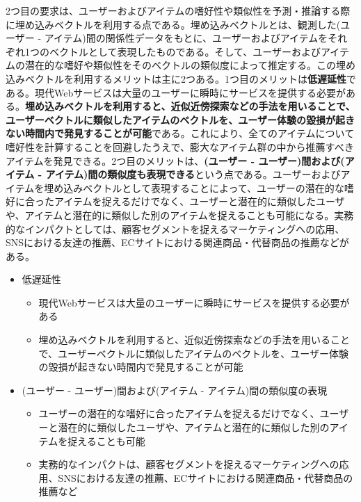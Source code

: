 \documentclass[11pt,a4paper]{article}
\begin{document}
2つ目の要求は、ユーザーおよびアイテムの嗜好性や類似性を予測・推論する際に埋め込みベクトルを利用する点である。埋め込みベクトルとは、観測した(ユーザー - アイテム)間の関係性データをもとに、ユーザーおよびアイテムをそれぞれ1つのベクトルとして表現したものである。そして、ユーザーおよびアイテムの潜在的な嗜好や類似性をそのベクトルの類似度によって推定する。この埋め込みベクトルを利用するメリットは主に2つある。1つ目のメリットは\textbf{低遅延性}である。現代Webサービスは大量のユーザーに瞬時にサービスを提供する必要がある。\textbf{埋め込みベクトルを利用すると、近似近傍探索などの手法を用いることで、ユーザーベクトルに類似したアイテムのベクトルを、ユーザー体験の毀損が起きない時間内で発見することが可能}である。これにより、全てのアイテムについて嗜好性を計算することを回避したうえで、膨大なアイテム群の中から推薦すべきアイテムを発見できる。2つ目のメリットは、\textbf{(ユーザー - ユーザー)間および(アイテム - アイテム)間の類似度も表現できる}という点である。ユーザーおよびアイテムを埋め込みベクトルとして表現することによって、ユーザーの潜在的な嗜好に合ったアイテムを捉えるだけでなく、ユーザーと潜在的に類似したユーザや、アイテムと潜在的に類似した別のアイテムを捉えることも可能になる。実務的なインパクトとしては、顧客セグメントを捉えるマーケティングへの応用、SNSにおける友達の推薦、ECサイトにおける関連商品・代替商品の推薦などがある。

\begin{itemize}
  \item 低遅延性
    \begin{itemize}
      \item 現代Webサービスは大量のユーザーに瞬時にサービスを提供する必要がある
      \item 埋め込みベクトルを利用すると、近似近傍探索などの手法を用いることで、ユーザーベクトルに類似したアイテムのベクトルを、ユーザー体験の毀損が起きない時間内で発見することが可能
    \end{itemize}
  \item (ユーザー - ユーザー)間および(アイテム - アイテム)間の類似度の表現
    \begin{itemize}
      \item ユーザーの潜在的な嗜好に合ったアイテムを捉えるだけでなく、ユーザーと潜在的に類似したユーザや、アイテムと潜在的に類似した別のアイテムを捉えることも可能
      \item 実務的なインパクトは、顧客セグメントを捉えるマーケティングへの応用、SNSにおける友達の推薦、ECサイトにおける関連商品・代替商品の推薦など
    \end{itemize}
\end{itemize}
\end{document}
